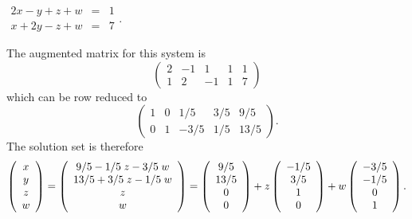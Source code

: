 \documentclass{ximera}
\begin{document}
\begin{exercise} \label{c2.3.10b}
$\begin{array}{rcl}
2x-y+z+w & = & 1\\
   x+2y-z+w & = & 7 \end{array}$.

\begin{solution}
The augmented matrix for this system is
\[
\left(\begin{array}{rrrr|r} 2 & -1 & 1 & 1 & 1 \\ 1 & 2 & -1 & 1 & 7
\end{array}\right)
\]
which can be row reduced to
\[
\left(\begin{array}{rrrr|r} 1 & 0 & 1/5 & 3/5 &
9/5 \\ 0 & 1 & -3/5 & 1/5 & 13/5
\end{array}\right).
\]
The solution set is therefore
\[
\left(\begin{array}{c} x \\ y \\ z \\ w \end{array}\right) =
\left(\begin{array}{c} 9/5 - 1/5\; z - 3/5\; w
\\ 13/5 + 3/5\; z - 1/5 \; w \\ z \\ w \end{array}\right)=
\left(\begin{array}{cccccccccccc} 9/5 \\ 13/5 \\ 0 \\ 0 \end{array}\right) + z\left(\begin{array}{cccccccccccc} -1/5\\  3/5 \\ 1 \\ 0 \end{array}\right) + w\left(\begin{array}{cccccccccccc} -3/5 \\ -1/5 \\ 0 \\ 1 \end{array}\right).
\]

\end{solution}
\end{exercise}
\end{document}
